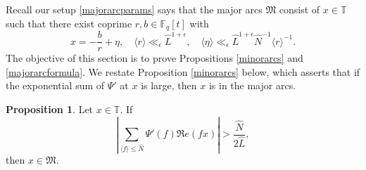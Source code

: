 \documentclass{article}
\theoremstyle{definition}
\newtheorem{prop}{Proposition}[section]
\theoremstyle{definition}
\theoremstyle{remark}
\newcommand{\F}{\mathbb{F}_q[t]}
\newcommand{\1}{\mathbf{1}}
\numberwithin{equation}{section}
\begin{document}
Recall our setup \eqref{majorarcparams} says that the major arcs $\mathfrak{M}$ consist of $x\in \mathbb{T}$ such that there exist coprime $r,b \in \F$ with 
\[x= -\frac{b}{r}+\eta,\quad \langle r \rangle \ll_{\epsilon} \widehat{L}^{1+\epsilon},\quad\langle \eta \rangle \ll_{\epsilon} \widehat{L}^{1+\epsilon}\widehat{N}^{-1}\langle r \rangle^{-1}.\] 
The objective of this section is to prove Propositions \ref{minorarcs} and \ref{majorarcformula}. We restate Proposition \ref{minorarcs} below, which asserts that if the exponential sum of $\Psi'$ at $x$ is large, then $x$ is in the major arcs. 

\setcounter{saveprop}{\value{prop}}

\begingroup
  \renewcommand{\theprop}{5.\arabic{prop}}

  \setcounter{prop}{1} %
  \begin{prop}\label{prop:5.2}
 Let $x\in \mathbb{T}$. If 
\[\left|\sum_{\langle f\rangle \leq \widehat{N}} \Psi'(f)\Re e(fx)\right|>\frac{\widehat{N}}{2\widehat{L}},\]
then $x\in \mathfrak{M}$. 
  \end{prop}
\end{document}
